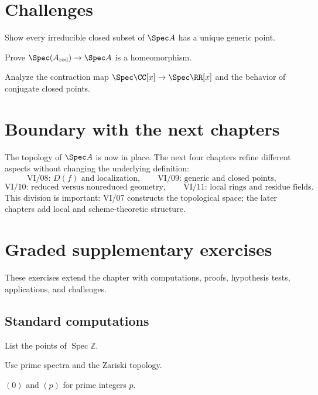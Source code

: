 \section{Challenges}
\ifdefined\FullProblemDossiers

\else
\begin{problem}Show every irreducible closed subset of $\Spec A$ has a unique generic point.\end{problem}
\begin{problem}Prove $\Spec(A_{\mathrm{red}})\to\Spec A$ is a homeomorphism.\end{problem}
\begin{problem}Analyze the contraction map $\Spec\CC[x]\to\Spec\RR[x]$ and the behavior of conjugate closed points.\end{problem}
\fi

\section{Boundary with the next chapters}

The topology of $\Spec A$ is now in place.  The next four chapters refine different aspects
without changing the underlying definition:
\[
\text{VI/08: }D(f)\text{ and localization},
\qquad
\text{VI/09: generic and closed points},
\]
\[
\text{VI/10: reduced versus nonreduced geometry},
\qquad
\text{VI/11: local rings and residue fields}.
\]
This division is important: VI/07 constructs the topological space; the later chapters add
local and scheme-theoretic structure.
\section{Graded supplementary exercises}
These exercises extend the chapter with computations, proofs, hypothesis tests, applications, and challenges.

\subsection*{Standard computations}

\begin{exercise}\label{exr:vi07-expand-01}
List the points of $\operatorname{Spec}\mathbb Z$.
\end{exercise}
\begin{hint}
Use prime spectra and the Zariski topology.
\end{hint}
\begin{solution}
$(0)$ and $(p)$ for prime integers $p$.
\end{solution}

